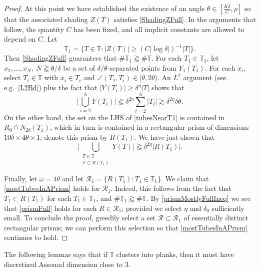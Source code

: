 \documentclass[letterpaper, reqno,11pt]{article}
\numberwithin{equation}{section}
\newcommand{\tubes}{\mathbb{T}}
\numberwithin{thm}{section}
\theoremstyle{remark}
\begin{document}
\begin{proof}
At this point we have established the existence of an angle $\theta\in [\frac{K\delta}{C},\rho]$ so that the associated shading $Z(T)$ satisfies \eqref{ShadingZFull}. In the arguments that follow, the quantity $C$ has been fixed, and all implicit constants are allowed to depend on $C$. Let 
\begin{equation}\label{tubes1}
\tubes_1=\big\{T\in\tubes\colon |Z(T)|\geq (C|\log\delta|)^{-1} |T|\big\}.
\end{equation}
Then \eqref{ShadingZFull} guarantees that $\#\tubes_1\gtrapprox\#\tubes$.  For each $T_1\in \tubes_1$, let $x_2,\ldots,x_N,\ N\gtrapprox \theta/\delta$ be a set of $\delta/\theta$-separated points from $Y_1(T_1)$. For each $x_i$, select $T_i\in\tubes$ with $x_i\in T_i$ and $\angle(T_1,T_i)\in[\theta,2\theta)$. An $L^2$ argument (see e.g.~\eqref{L2Bd}) plus the fact that $|Y(T_i)|\geq \delta^\eta|T|$ shows that
\begin{equation}\label{tubesNearT1}
\Big|\bigcup_{i=2}^N Y(T_i)\Big|\gtrapprox \delta^{2\eta}\sum_{i=2}^N|T_i| \gtrsim \delta^{2\eta}\delta\theta.
\end{equation}
On the other hand, the set on the LHS of \eqref{tubesNearT1} is contained in $R_0\cap N_{2\theta}(T_1)$, which in turn is contained in a rectangular prism of dimensions $10\delta\times 4\theta\times 1$; denote this prism by $R(T_1)$. We have just shown that
\begin{equation}\label{prismMostlyFullIneq}
\Big|\bigcup_{\substack{T\in\tubes \\ T\subset R(T_1)}}Y(T)\Big|\gtrapprox \delta^{2\eta}|R(T_1)|.
\end{equation}

Finally, let $\omega=4\theta$ and let $\mathcal{R}_1=\{R(T_1)\colon T_1\in\tubes_1\}$. We claim that \eqref{mostTubesInAPrism} holds for $\mathcal{R}_1$. Indeed, this follows from the fact that $T_1\subset R(T_1)$ for each $T_1\in\tubes_1$, and $\#\tubes_1\gtrapprox\#\tubes$. By \eqref{prismMostlyFullIneq} we see that \eqref{prismFull} holds for each $R\in\mathcal{R}_1$, provided we select $\eta$ and $\delta_0$ sufficiently small. To conclude the proof, greedily select a set $\mathcal{R}\subset\mathcal{R}_1$ of essentially distinct rectangular prisms; we can perform this selection so that \eqref{mostTubesInAPrism} continues to hold.
\end{proof}



The following lemmas says that if $\tubes$ clusters into planks, then it must have discretized Assouad dimension close to 3. 
\end{document}
